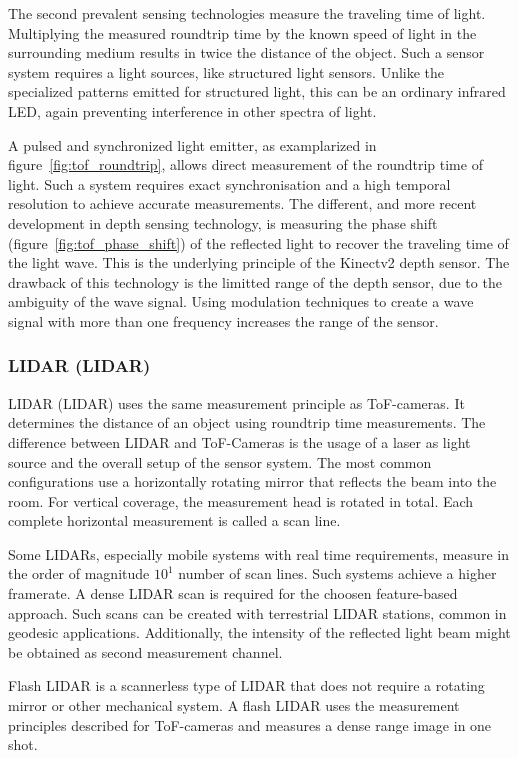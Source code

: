 The second prevalent sensing technologies measure the traveling time of light.
Multiplying the measured roundtrip time by the known speed of light in the surrounding medium results in twice the distance of the object.
Such a sensor system requires a light sources, like structured light sensors.
Unlike the specialized patterns emitted for structured light, this can be an ordinary infrared LED, again preventing interference in other spectra of light.

A pulsed and synchronized light emitter, as examplarized in figure~\ref{fig:tof_roundtrip}, allows direct measurement of the roundtrip time of light.
Such a system requires exact synchronisation and a high temporal resolution to achieve accurate measurements.
The different, and more recent development in depth sensing technology, is measuring the phase shift (figure~\ref{fig:tof_phase_shift}) of the reflected light to recover the traveling time of the light wave.
This is the underlying principle of the Kinectv2 depth sensor.
The drawback of this technology is the limitted range of the depth sensor, due to the ambiguity of the wave signal.
Using modulation techniques to create a wave signal with more than one frequency increases the range of the sensor.

\subsubsection{\acrlong{LIDAR} (\acrshort{LIDAR})}

\acrlong{LIDAR} (\acrshort{LIDAR}) uses the same measurement principle as \acrshort{ToF}-cameras.
It determines the distance of an object using roundtrip time measurements.
The difference between \acrshort{LIDAR} and \acrshort{ToF}-Cameras is the usage of a \acrshort{laser} as light source and the overall setup of the sensor system.
The most common configurations use a horizontally rotating mirror that reflects the beam into the room.
For vertical coverage, the measurement head is rotated in total.
Each complete horizontal measurement is called a scan line.

Some \acrshort{LIDAR}s, especially mobile systems with real time requirements, measure in the order of magnitude $10^1$ number of scan lines.
Such systems achieve a higher framerate.
A dense \acrshort{LIDAR} scan is required for the choosen feature-based approach.
Such scans can be created with terrestrial \acrshort{LIDAR} stations, common in geodesic applications.
Additionally, the intensity of the reflected light beam might be obtained as second measurement channel.

Flash \acrshort{LIDAR} is a scannerless type of \acrshort{LIDAR} that does not require a rotating mirror or other mechanical system.
A flash \acrshort{LIDAR} uses the measurement principles described for \acrshort{ToF}-cameras and measures a dense range image in one shot.

